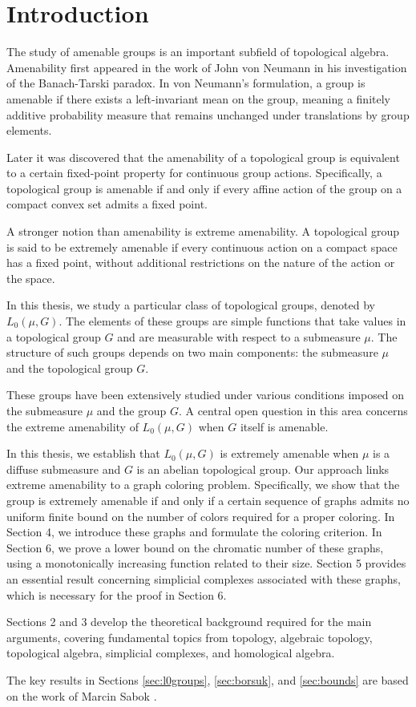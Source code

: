 \section{Introduction}
The study of amenable groups is an important subfield of topological algebra. Amenability first appeared in the work of John von Neumann \cite{vonNeumann1929} in his investigation of the Banach-Tarski paradox. In von Neumann’s formulation, a group is amenable if there exists a left-invariant mean on the group, meaning a finitely additive probability measure that remains unchanged under translations by group elements.

Later it was discovered that the amenability of a topological group is equivalent to a certain fixed-point property for continuous group actions. Specifically, a topological group is amenable if and only if every affine action of the group on a compact convex set admits a fixed point.

A stronger notion than amenability is extreme amenability. A topological group is said to be extremely amenable if every continuous action on a compact space has a fixed point, without additional restrictions on the nature of the action or the space.

In this thesis, we study a particular class of topological groups, denoted by $L_0(\mu, G)$. The elements of these groups are simple functions that take values in a topological group $G$ and are measurable with respect to a submeasure $\mu$. The structure of such groups depends on two main components: the submeasure $\mu$ and the topological group $G$.

These groups have been extensively studied under various conditions imposed on the submeasure $\mu$ and the group $G$. A central open question in this area concerns the extreme amenability of $L_0(\mu, G)$ when $G$ itself is amenable.

In this thesis, we establish that $L_0(\mu, G)$ is extremely amenable when $\mu$ is a diffuse submeasure and $G$ is an abelian topological group. Our approach links extreme amenability to a graph coloring problem. Specifically, we show that the group is extremely amenable if and only if a certain sequence of graphs admits no uniform finite bound on the number of colors required for a proper coloring. In Section 4, we introduce these graphs and formulate the coloring criterion. In Section 6, we prove a lower bound on the chromatic number of these graphs, using a monotonically increasing function related to their size. Section 5 provides an essential result concerning simplicial complexes associated with these graphs, which is necessary for the proof in Section 6.

Sections 2 and 3 develop the theoretical background required for the main arguments, covering fundamental topics from topology, algebraic topology, topological algebra, simplicial complexes, and homological algebra.

The key results in Sections \ref{sec:l0groups}, \ref{sec:borsuk}, and \ref{sec:bounds} are based on the work of Marcin Sabok \cite{sabok2012}.
